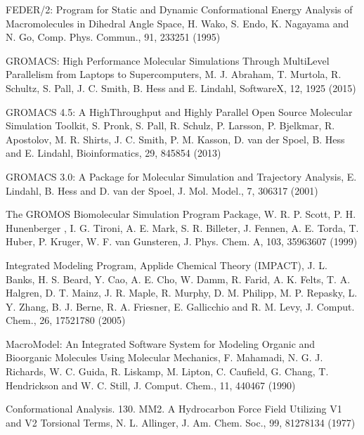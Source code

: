 \documentclass[letterpaper,11pt,english]{sphinxmanual}
\begin{document}

FEDER/2: Program for Static and Dynamic Conformational Energy Analysis of Macro\sphinxhyphen{}molecules in Dihedral Angle Space, H. Wako, S. Endo, K. Nagayama and N. Go, Comp. Phys. Commun., 91, 233\sphinxhyphen{}251 (1995)


GROMACS: High Performance Molecular Simulations Through Multi\sphinxhyphen{}Level Parallelism from Laptops to Supercomputers, M. J. Abraham, T. Murtola, R. Schultz, S. Pall, J. C. Smith, B. Hess and E. Lindahl, SoftwareX, 1\sphinxhyphen{}2, 19\sphinxhyphen{}25 (2015)

GROMACS 4.5: A High\sphinxhyphen{}Throughput and Highly Parallel Open Source Molecular Simulation Toolkit, S. Pronk, S. Pall, R. Schulz, P. Larsson, P. Bjelkmar, R. Apostolov, M. R. Shirts, J. C. Smith, P. M. Kasson, D. van der Spoel, B. Hess and E. Lindahl, Bioinformatics, 29, 845\sphinxhyphen{}854 (2013)

GROMACS 3.0: A Package for Molecular Simulation and Trajectory Analysis, E. Lindahl, B. Hess and D. van der Spoel, J. Mol. Model., 7, 306\sphinxhyphen{}317 (2001)


The GROMOS Biomolecular Simulation Program Package, W. R. P. Scott, P. H. Hunenberger , I. G. Tironi, A. E. Mark, S. R. Billeter, J. Fennen, A. E. Torda, T. Huber, P. Kruger, W. F. van Gunsteren, J. Phys. Chem. A, 103, 3596\sphinxhyphen{}3607 (1999)


Integrated Modeling Program, Applide Chemical Theory (IMPACT), J. L. Banks, H. S. Beard, Y. Cao, A. E. Cho, W. Damm, R. Farid, A. K. Felts, T. A. Halgren, D. T. Mainz, J. R. Maple, R. Murphy, D. M. Philipp, M. P. Repasky, L. Y. Zhang, B. J. Berne, R. A. Friesner, E. Gallicchio and R. M. Levy, J. Comput. Chem., 26, 1752\sphinxhyphen{}1780 (2005)


MacroModel: An Integrated Software System for Modeling Organic and Bioorganic Molecules Using Molecular Mechanics, F. Mahamadi, N. G. J. Richards, W. C. Guida, R. Liskamp, M. Lipton, C. Caufield, G. Chang, T. Hendrickson and W. C. Still, J. Comput. Chem., 11, 440\sphinxhyphen{}467 (1990)


Conformational Analysis. 130. MM2. A Hydrocarbon Force Field Utilizing V1 and V2 Torsional Terms, N. L. Allinger, J. Am. Chem. Soc., 99, 8127\sphinxhyphen{}8134 (1977)
\end{document}
